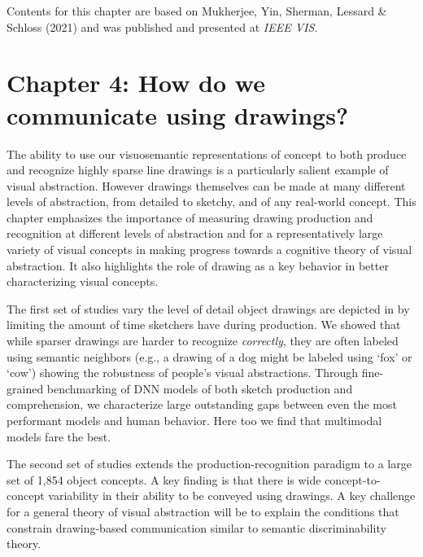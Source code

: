 \documentclass{Dissertate}
\begin{document}
\begin{tcolorbox}[
    colback=gray!10,  %
    colframe=black!50, %
    arc=4mm,         %
    boxrule=2pt      %
]
Contents for this chapter are based on Mukherjee, Yin, Sherman, Lessard \& Schloss (2021) and was published and presented at \textit{IEEE VIS}.
\end{tcolorbox}

\section*{Chapter 4: How do we communicate using drawings?}

The ability to use our visuosemantic representations of concept to both produce and recognize highly sparse line drawings is a particularly salient example of visual abstraction.
However drawings themselves can be made at many different levels of abstraction, from detailed to sketchy, and of any real-world concept.
This chapter emphasizes the importance of measuring drawing production and recognition at different levels of abstraction and for a representatively large variety of visual concepts in making progress towards a cognitive theory of visual abstraction.
It also highlights the role of drawing as a key behavior in better characterizing visual concepts.

The first set of studies vary the level of detail object drawings are depicted in by limiting the amount of time sketchers have during production.
We showed that while sparser drawings are harder to recognize \textit{correctly}, they are often labeled using semantic neighbors (e.g., a drawing of a dog might be labeled using `fox' or `cow') showing the robustness of people's visual abstractions.
Through fine-grained benchmarking of DNN models of both sketch production and comprehension, we characterize large outstanding gaps between even the most performant models and human behavior.
Here too we find that multimodal models fare the best.

The second set of studies extends the production-recognition paradigm to a large set of 1,854 object concepts.
A key finding is that there is wide concept-to-concept variability in their ability to be conveyed using drawings.
A key challenge for a general theory of visual abstraction will be to explain the conditions that constrain drawing-based communication similar to semantic discriminability theory.
\end{document}
